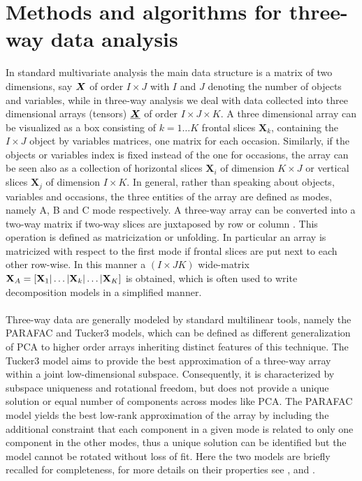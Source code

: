 \documentclass[article,shortnames, nojss]{jss}
\newcommand{\vv}[1]{\mbox{\boldmath$#1$}}
\begin{document}
\section{Methods and algorithms for three-way data analysis}
\label{sec:theory}
In standard multivariate analysis the main data structure is
a matrix of two dimensions, say $\vv{X}$ of order $I \times J$
with $I$ and $J$ denoting the number of objects and variables, while in three-way
analysis we deal with data collected into three
dimensional arrays (tensors) $\vv{\underline{X}}$ of order
$I \times J \times K$. A three dimensional array can be visualized as
a box consisting of $k=1 \ldots K$ frontal slices $\mathbf{X}_k$, containing the $I \times J$ object by variables matrices, one matrix for each occasion.
Similarly, if the objects or variables index is fixed instead of the one for occasions, the array can be seen also as a collection of horizontal slices $\mathbf{X}_i$ of dimension $K \times J$ or vertical slices $\mathbf{X}_j$ of dimension $I \times K$.
In general, rather than speaking about objects, variables and occasions, the three entities of the array are defined as modes, namely A, B and C mode respectively.
A three-way array can be converted into a two-way matrix if two-way slices are juxtaposed by row or column \citep[p.7]{kroonenberg:2008}. This operation is defined as matricization or unfolding. In particular an array is matricized with respect to the first mode if frontal slices are put next to each other row-wise. In this manner a $(I\times J K)$ wide-matrix ${\bf X}_A = [{\bf X}_1|\ldots|{\bf X}_k|\ldots|{\bf X}_K]$ is obtained, which is often used to write decomposition models in a simplified manner.\\\\
Three-way data are generally modeled by standard multilinear tools, namely the PARAFAC and Tucker3 models, which can be defined as different generalization of PCA to higher order arrays inheriting distinct features of this technique. The Tucker3 model aims to provide the best approximation of a three-way array within a joint low-dimensional subspace. Consequently, it is characterized by subspace uniqueness and rotational freedom, but does not provide a unique solution or equal number of components across modes like PCA. The PARAFAC model yields the best low-rank approximation of the array by including the additional constraint that each component in a given mode is related to only one component in the other modes, thus a unique solution can be identified but the model cannot be rotated without loss of fit.
Here the two models are briefly recalled for completeness, for more details on their properties see \cite{harshman1994parafac}, \cite{smilde:2004} and \cite{kroonenberg:2008}.
\end{document}
